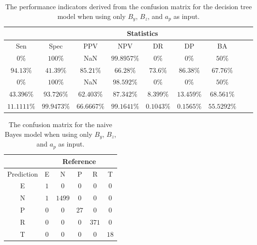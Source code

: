 \begin{table}[!ht]
	\centering
	\begin{tabular}{|c|c|c|c|c|c|c|c|c|}
		\hline
		 & \multicolumn{7}{c|}{Statistics} \\ \hline
		Sen & Spec & PPV & NPV & DR & DP & BA \\ \hline
		$0\%$ & $100\%$ & NaN & $99.8957\%$ & $0\%$ & $0\%$ & $50\%$ \\ \hline
		$94.13\%$ & $41.39\%$ & $85.21\%$ & $66.28\%$ & $73.6\%$ & $86.38\%$ & $67.76\%$ \\ \hline
		$0\%$ & $100\%$ & NaN & $98.592\%$ & $0\%$ & $0\%$ & $50\%$ \\ \hline
		$43.396\%$ & $93.726\%$ & $62.403\%$ & $87.342\%$ & $8.399\%$ & $13.459\%$ & $68.561\%$ \\ \hline
		$11.1111\%$ & $99.9473\%$ & $66.6667\%$ & $99.1641\%$ & $0.1043\%$ & $0.1565\%$ & $55.5292\%$ \\ \hline
	\end{tabular}
	\caption{The performance indicators derived from the confusion matrix for the decision tree model when using only $B_{y}$, $B_{z}$, and $a_{p}$ as input.}
	\label{tab:cs:yzap:C5.0}
\end{table}

\begin{table}[!ht]
	\centering
	\begin{tabular}{|c|c|c|c|c|c|}
		\hline
		 & \multicolumn{5}{|c|}{Reference} \\ \hline
		 Prediction & E & N & P & R & T \\ \hline
		 E & $1$ & $0$ & $0$ & $0$ & $0$ \\ \hline
		 N & $1$ & $1499$ & $0$ & $0$ & $0$ \\ \hline
		 P & $0$ & $0$ & $27$ & $0$ & $0$ \\ \hline
		 R & $0$ & $0$ & $0$ & $371$ & $0$ \\ \hline
		 T & $0$ & $0$ & $0$ & $0$ & $18$ \\ \hline
	\end{tabular}
	\caption{The confusion matrix for the naive Bayes model when using only $B_{y}$, $B_{z}$, and $a_{p}$ as input.}
	\label{tab:cm:yzap:nb}
\end{table}

